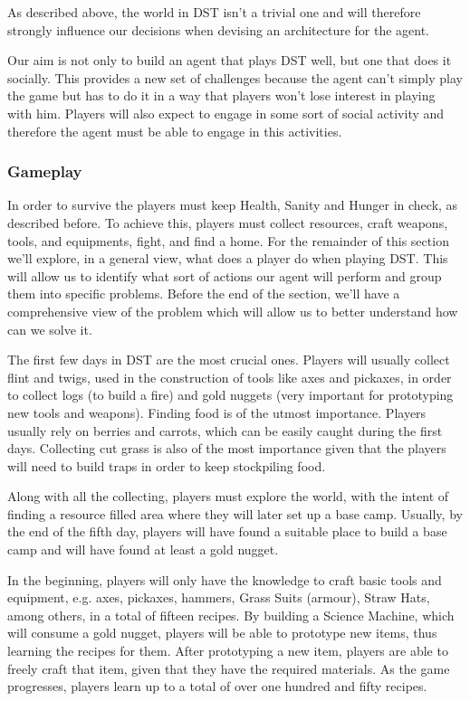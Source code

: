 As described above, the world in \ac{DST} isn't a trivial one and will therefore strongly influence our decisions when devising an architecture for the agent.

Our aim is not only to build an agent that plays \ac{DST} well, but one that does it socially.
This provides a new set of challenges because the agent can't simply play the game but has to do it in a way that players won't lose interest in playing with him.
Players will also expect to engage in some sort of social activity and therefore the agent must be able to engage in this activities.

\subsubsection{Gameplay}
In order to survive the players must keep Health, Sanity and Hunger in check, as described before.
To achieve this, players must collect resources, craft weapons, tools, and equipments, fight, and find a home.
For the remainder of this section we'll explore, in a general view, what does a player do when playing \ac{DST}.
This will allow us to identify what sort of actions our agent will perform and group them into specific problems.
Before the end of the section, we'll have a comprehensive view of the problem which will allow us to better understand how can we solve it.

The first few days in \ac{DST} are the most crucial ones.
Players will usually collect flint and twigs, used in the construction of tools like axes and pickaxes, in order to collect logs (to build a fire) and gold nuggets (very important for prototyping new tools and weapons).
Finding food is of the utmost importance. 
Players usually rely on berries and carrots, which can be easily caught during the first days.
Collecting cut grass is also of the most importance given that the players will need to build traps in order to keep stockpiling food.

Along with all the collecting, players must explore the world, with the intent of finding a resource filled area where they will later set up a base camp.
Usually, by the end of the fifth day, players will have found a suitable place to build a base camp and will have found at least a gold nugget.

In the beginning, players will only have the knowledge to craft basic tools and equipment, e.g. axes, pickaxes, hammers, Grass Suits (armour), Straw Hats, among others, in a total of fifteen recipes.
By building a Science Machine, which will consume a gold nugget, players will be able to prototype new items, thus learning the recipes for them.
After prototyping a new item, players are able to freely craft that item, given that they have the required materials.
As the game progresses, players learn up to a total of over one hundred and fifty recipes.


